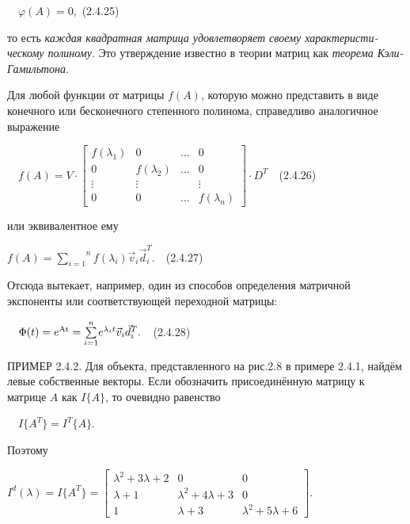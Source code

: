 		\ \  $\varphi (A)=0,$  (2.4.25)



		то есть \textit{каждая квадратная матрица удовлетворяет своему харак­те­ри­сти­ческому полиному}. Это утверждение
		известно в теории матриц как \textit{теорема Кэли-Гамильтона}.



		Для любой функции от матрицы  $f(A)$, которую можно представить в виде конечного или бесконечного степенного полинома,
		справедливо аналогичное выражение



		\ \  $f(A)=V\cdot \left[\begin{matrix}f(\lambda _1)&0&\ldots &0\\0&f(\lambda _2)&\ldots &0\\\vdots &\vdots &&\vdots \\0&0&\ldots
		&f(\lambda _n)\end{matrix}\right]\cdot D^T$\ \ (2.4.26)



		или эквивалентное ему



		   $f(A)=\overset n{\underset{i=1}{\sum }}f(\lambda _i)\vec v_i\vec d_i^T.$\ \ (2.4.27)



		Отсюда вытекает, например, один из способов определения матричной экспоненты или соответствующей переходной матрицы:



		\ \  $\Phi (t)=e^{\normalsubformula{\text{At}}}=\overset n{\underset{i=1}{\sum }}e^{\lambda _it}\vec v_i\vec d_i^T.$\ \ (2.4.28)



\bigskip


		ПРИМЕР 2.4.2. Для объекта, представленного на рис.2.8 в примере 2.4.1, найдём левые собственные векторы. Если обозначить
		присоединённую матрицу к матрице  $A$ как  $I\{A\}$, то очевидно равенство 



		\ \  $I\{A^T\}=I^T\{A\}$.



		Поэтому



		$I^d(\lambda )=I\{A^T\}=\left[\begin{matrix}\lambda ^2+3\lambda +2&0&0\\\lambda +1&\lambda ^2+4\lambda +3&0\\1&\lambda +3&\lambda ^2+5\lambda +6\end{matrix}\right]$.



